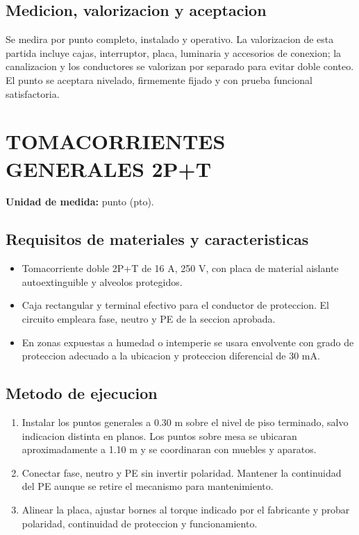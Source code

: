 \subsection{Medicion, valorizacion y aceptacion}
Se medira por punto completo, instalado y operativo. La valorizacion de esta partida
incluye cajas, interruptor, placa, luminaria y accesorios de conexion; la canalizacion
y los conductores se valorizan por separado para evitar doble conteo. El punto se
aceptara nivelado, firmemente fijado y con prueba funcional satisfactoria.

\section{TOMACORRIENTES GENERALES 2P+T}

\textbf{Unidad de medida:} punto (pto).

\subsection{Requisitos de materiales y caracteristicas}
\begin{itemize}
  \item Tomacorriente doble 2P+T de 16 A, 250 V, con placa de material aislante
  autoextinguible y alveolos protegidos.
  \item Caja rectangular y terminal efectivo para el conductor de proteccion. El
  circuito empleara fase, neutro y PE de la seccion aprobada.
  \item En zonas expuestas a humedad o intemperie se usara envolvente con grado de
  proteccion adecuado a la ubicacion y proteccion diferencial de 30 mA.
\end{itemize}

\subsection{Metodo de ejecucion}
\begin{enumerate}
  \item Instalar los puntos generales a 0.30 m sobre el nivel de piso terminado, salvo
  indicacion distinta en planos. Los puntos sobre mesa se ubicaran aproximadamente a
  1.10 m y se coordinaran con muebles y aparatos.
  \item Conectar fase, neutro y PE sin invertir polaridad. Mantener la continuidad del
  PE aunque se retire el mecanismo para mantenimiento.
  \item Alinear la placa, ajustar bornes al torque indicado por el fabricante y probar
  polaridad, continuidad de proteccion y funcionamiento.
\end{enumerate}

